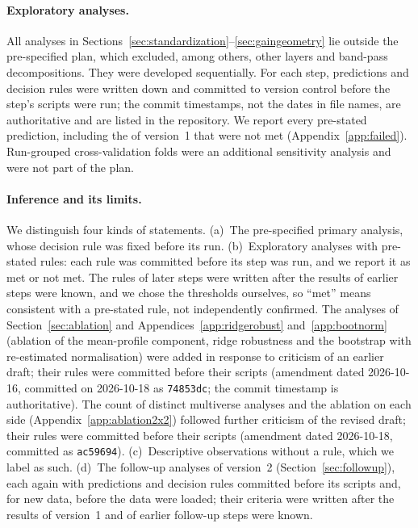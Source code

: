 \paragraph{Exploratory analyses.}
All analyses in Sections~\ref{sec:standardization}--\ref{sec:gaingeometry} lie outside
the pre-specified plan, which excluded, among others, other layers and band-pass
decompositions. They were developed sequentially. For each step, predictions and
decision rules were written down and committed to version control before the step's
scripts were run; the commit timestamps, not the dates in file names, are authoritative
and are listed in the repository. We report every pre-stated prediction, including the
\FailedPredictionsVone{} of version~1 that were not met (Appendix~\ref{app:failed}). Run-grouped cross-validation
folds were an additional sensitivity analysis and were not part of the plan.

\paragraph{Inference and its limits.}
We distinguish four kinds of statements. (a)~The pre-specified primary analysis, whose decision rule was fixed before its run. (b)~Exploratory analyses with pre-stated rules: each rule was committed before its step was run, and we report it as met or not met. The rules of later steps were written after the results of earlier steps were known, and we chose the thresholds ourselves, so ``met'' means consistent with a pre-stated rule, not independently confirmed. The analyses of Section~\ref{sec:ablation} and Appendices~\ref{app:ridgerobust} and~\ref{app:bootnorm} (ablation of the mean-profile component, ridge robustness and the bootstrap with re-estimated normalisation) were added in response to criticism of an earlier draft; their rules were committed before their scripts (amendment dated 2026-10-16, committed on 2026-10-18 as \texttt{74853dc}; the commit timestamp is authoritative). The count of distinct multiverse analyses and the ablation on each side (Appendix~\ref{app:ablation2x2}) followed further criticism of the revised draft; their rules were committed before their scripts (amendment dated 2026-10-18, committed as \texttt{ac59694}). (c)~Descriptive observations without a rule, which we label as such. (d)~The follow-up analyses of version~2 (Section~\ref{sec:followup}), each again with predictions and decision rules committed before its scripts and, for new data, before the data were loaded; their criteria were written after the results of version~1 and of earlier follow-up steps were known.

